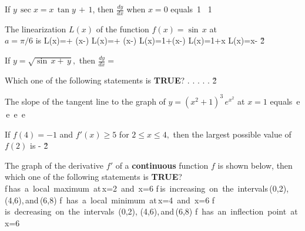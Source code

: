 \documentclass[amsfonts,bezier,leqno,fleqn,12pt,a4paper]{article}
\begin{document}
\begin{large}
\item %
If $y\,\sec x=x\, \tan y \,+\, 1$, then $\displaystyle {\frac{dy}{dx}}$ when $x=0$ equals
\sc
\be
\displaystyle \tan\,1
\ee
\be
\displaystyle {}
\ee
\be
\displaystyle \sec\, 1
\ee
\be
\displaystyle {}
\ee
{}
\ee
\newpage



\item %
The linearization  $L(x)$ of the function $f(x)=\sin\,x$ at \\$a=\pi/6$ is
\sc
\be
\displaystyle L(x)=+ \left(x-\right)
\ee
\be
\displaystyle L(x)=+ \left(x-\right)
\ee
\be
\displaystyle L(x)=1+\left(x-\right)
\ee
\be
\displaystyle L(x)=1+x
\ee
\be
\displaystyle L(x)=x-
\ee
\v2



\item %
If $y=\sqrt{\sin \,x+\,y},$ then $\displaystyle \frac{dy}{dx}=$
\sc
\be
\displaystyle {}
\ee
\be
\displaystyle {}
\ee
\be
\displaystyle {}
\ee
\be
\displaystyle {}
\ee
\be
\displaystyle {}
\ee
\newpage



\item %
Which one of the following statements is \textbf{TRUE}?
\sc
\be
.
\ee
\be
.
\ee
\be
.
\ee
\be
.
\ee
\be
.
\ee
\v2



\item %
The slope of the tangent line to the graph of $y=(x^2+1)^3\,e^{x^2}$ at $x=1$ equals
\sc
{}\,e
\ee
{}
\ee
{}\,e
\ee
{}\,e
\ee
{}\,e
\ee
\newpage



\item %
If $f(4)=-1$ and $f'(x)\geq 5$ for $2\leq x \leq 4,$ then the largest possible value of $f(2)$ is
\sc
{}
\ee
{}
\ee
{}
\ee
\be
\displaystyle -
\ee
{}
\ee
\v2



\item %
The graph of the derivative $f'$ of a \textbf{continuous} function $f$ is shown below, then which one of the following statements is \textbf{TRUE}?\\[0.5in]
\sc
\be
f\,\mbox{has a local maximum at}\,x=2 \,\mbox{and}\, x=6
\ee
\be
f\,\mbox{is increasing on the intervals}\,(0,2),(4,6),\,\mbox{and}\,(6,8)
\ee
\be
f\, \mbox{has a local minimum at}\,x=4 \,\mbox{and}\, x=6
\ee
\be
f\, \mbox{is decreasing on the intervals}\, (0,2), (4,6),\,\mbox{and}\,(6,8)
\ee
\be
f\, \mbox{has an inflection point at}\,x=6
\ee
\newpage




\end{large}
\end{document}
